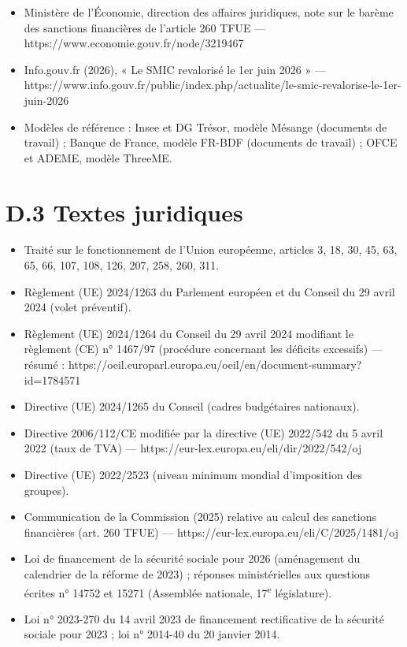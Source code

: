 \documentclass[
  11pt,
  11pt,
  a4paper,
  openany]{book}
\providecommand{\tightlist}{%
  \setlength{\itemsep}{0pt}\setlength{\parskip}{0pt}}
\begin{document}
\begin{itemize}
\item
  Ministère de l'Économie, direction des affaires juridiques, note sur
  le barème des sanctions financières de l'article 260 TFUE ---
  https://www.economie.gouv.fr/node/3219467
\item
  Info.gouv.fr (2026), « Le SMIC revalorisé le 1er juin 2026 » ---
  https://www.info.gouv.fr/public/index.php/actualite/le-smic-revalorise-le-1er-juin-2026
\item
  Modèles de référence : Insee et DG Trésor, modèle Mésange (documents
  de travail) ; Banque de France, modèle FR-BDF (documents de travail) ;
  OFCE et ADEME, modèle ThreeME.
\end{itemize}

\hypertarget{d.3-textes-juridiques}{%
\section{D.3 Textes juridiques}\label{d.3-textes-juridiques}}

\begin{itemize}
\tightlist
\item
  Traité sur le fonctionnement de l'Union européenne, articles 3, 18,
  30, 45, 63, 65, 66, 107, 108, 126, 207, 258, 260, 311.
\item
  Règlement (UE) 2024/1263 du Parlement européen et du Conseil du 29
  avril 2024 (volet préventif).
\item
  Règlement (UE) 2024/1264 du Conseil du 29 avril 2024 modifiant le
  règlement (CE) n° 1467/97 (procédure concernant les déficits
  excessifs) --- résumé :
  https://oeil.europarl.europa.eu/oeil/en/document-summary?id=1784571
\item
  Directive (UE) 2024/1265 du Conseil (cadres budgétaires nationaux).
\item
  Directive 2006/112/CE modifiée par la directive (UE) 2022/542 du 5
  avril 2022 (taux de TVA) ---
  https://eur-lex.europa.eu/eli/dir/2022/542/oj
\item
  Directive (UE) 2022/2523 (niveau minimum mondial d'imposition des
  groupes).
\item
  Communication de la Commission (2025) relative au calcul des sanctions
  financières (art. 260 TFUE) ---
  https://eur-lex.europa.eu/eli/C/2025/1481/oj
\item
  Loi de financement de la sécurité sociale pour 2026 (aménagement du
  calendrier de la réforme de 2023) ; réponses ministérielles aux
  questions écrites n° 14752 et 15271 (Assemblée nationale,
  17\textsuperscript{e} législature).
\item
  Loi n° 2023-270 du 14 avril 2023 de financement rectificative de la
  sécurité sociale pour 2023 ; loi n° 2014-40 du 20 janvier 2014.
\end{itemize}
\end{document}
